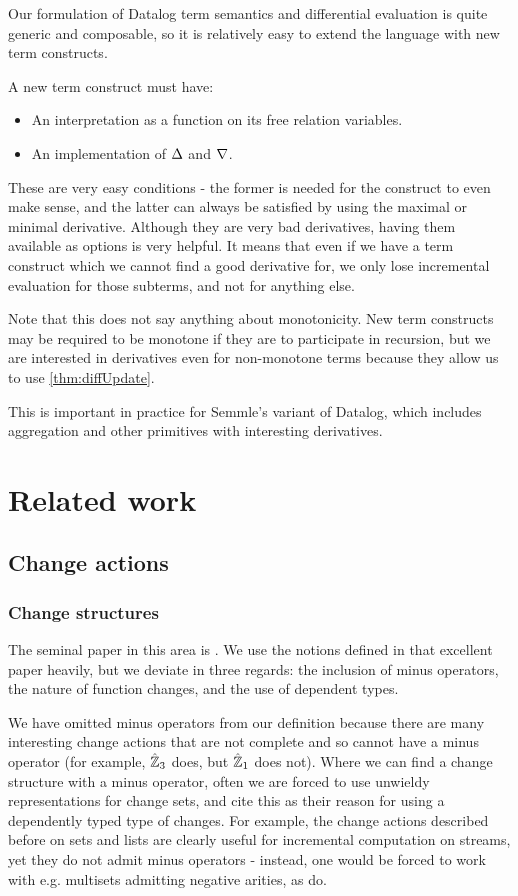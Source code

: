 Our formulation of Datalog term semantics and differential evaluation is quite
generic and composable, so it is relatively easy to extend the language with new
term constructs.

A new term construct must have:
\begin{itemize}
  \item An interpretation as a function on its free relation variables.
  \item An implementation of $\Delta$ and $\nabla$.
\end{itemize}

These are very easy conditions - the former is needed for the construct to even
make sense, and the latter can always be satisfied by using the maximal or
minimal derivative. Although they are very bad derivatives, having them
available as options is very helpful. It means that even if we have a term
construct which we cannot find a good derivative for, we only lose incremental
evaluation for those subterms, and not for anything else.

Note that this does not say anything about monotonicity. New term constructs may
be required to be monotone if they are to participate in recursion, but we are
interested in derivatives even for non-monotone terms because they allow us to
use \cref{thm:diffUpdate}.

This is important in practice for Semmle's variant of Datalog, which includes
aggregation and other primitives with interesting derivatives.

\section{Related work}

\subsection{Change actions}

\subsubsection{Change structures}
\label{sec:relatedChangeStructures}

The seminal paper in this area is \textcite{cai2014changes}. We use the notions
defined in that excellent paper heavily, but we deviate in three regards: the
inclusion of minus operators, the nature of function changes, and the use of
dependent types.

We have omitted minus operators from our definition because
there are many interesting change actions that are not complete and so cannot 
have a minus operator (for example, $\hat{\mathbb{Z}}_3$ does, but $\hat{\mathbb{Z}}_1$ does
not). Where we can find a change structure with a minus operator, often we are
forced to use unwieldy representations for change sets, and
\citeauthor{cai2014changes} cite this as their reason for using a dependently
typed type of changes. For example, the change actions described before on sets and lists are clearly
useful for incremental computation on streams, yet they do not admit minus operators - instead, one would
be forced to work with e.g. multisets admitting negative arities, as \citeauthor{cai2014changes} do.

